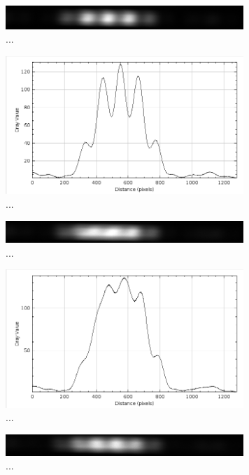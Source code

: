 \documentclass{article}
\begin{document}
\begin{figure}[H]
\centering
\caption{...}
\includegraphics[width=9cm]{moodle/img4.png}
\end{figure}

\begin{figure}[H]
\centering
\caption{...}
\includegraphics[width=9cm]{moodle/img4_graph.png}
\end{figure}




\begin{figure}[H]
\centering
\caption{...}
\includegraphics[width=9cm]{moodle/img5.png}
\end{figure}

\begin{figure}[H]
\centering
\caption{...}
\includegraphics[width=9cm]{moodle/img5_graph.png}
\end{figure}



\begin{figure}[H]
\centering
\caption{...}
\includegraphics[width=9cm]{moodle/img6.png}
\end{figure}
\end{document}
